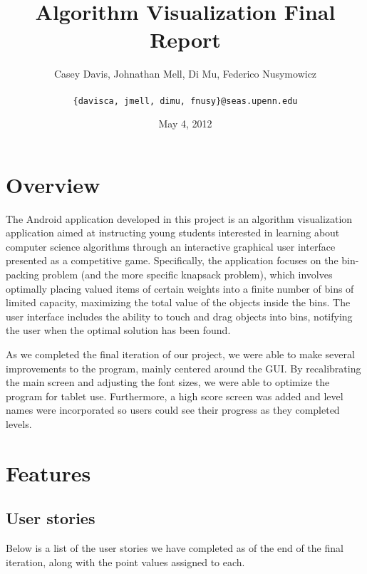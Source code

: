 \documentclass[11pt]{article}
\title{Algorithm Visualization Final Report}
\author{Casey Davis, Johnathan Mell, Di Mu, Federico Nusymowicz \\\\
\texttt{\{davisca, jmell, dimu, fnusy\}@seas.upenn.edu}}
\date{May 4, 2012}
\begin{document}
\maketitle

\section{Overview}

The Android application developed in this project is an algorithm visualization
application aimed at instructing young students interested in learning about
computer science algorithms through an interactive graphical user interface
presented as a competitive game.  Specifically, the application focuses on the
bin-packing problem (and the more specific knapsack problem), which involves
optimally placing valued items of certain weights into a finite number of bins
of limited capacity, maximizing the total value of the objects inside the bins.
The user interface includes the ability to touch and drag objects into bins,
notifying the user when the optimal solution has been found.

As we completed the final iteration of our project, we were able to make several
improvements to the program, mainly centered around the GUI.  By recalibrating
the main screen and adjusting the font sizes, we were able to optimize the
program for tablet use.  Furthermore, a high score screen was added and level
names were incorporated so users could see their progress as they completed
levels.

\section{Features}

\subsection{User stories}

Below is a list of the user stories we have completed as of the end of the final
iteration, along with the point values assigned to each.
\end{document}
